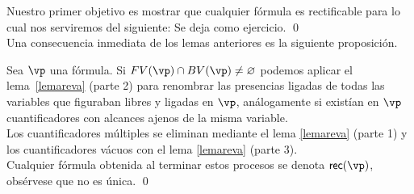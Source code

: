 \documentclass[11pt,letterpaper]{article}
\begin{document}
\noindent Nuestro primer objetivo es mostrar que cualquier fórmula es
rectificable para lo cual nos serviremos del siguiente:
\proof
Se deja como ejercicio.
\qed
\bigskip\\

Una consecuencia inmediata de los lemas anteriores es la siguiente proposición.

\proof
Sea $\vp$ una f\'ormula. Si $FV(\vp)\cap BV(\vp)\neq\varnothing$
podemos aplicar el lema~\ref{lemareva} (parte 2) para renombrar las
presencias ligadas de todas las variables que figuraban libres y
ligadas en $\vp$, an\'alogamente si existían en $\vp$ cuantificadores
con alcances ajenos de la misma variable. \\
Los cuantificadores m\'ultiples se eliminan mediante el lema 
\ref{lemareva} (parte 1) y los cuantificadores v\'acuos con el lema 
\ref{lemareva} (parte 3). \\
Cualquier f\'ormula obtenida al terminar estos procesos se denota 
$\mathsf{rec}(\vp)$,
obs\'ervese que no es \'unica.
\qed

\vspace{.5cm}
\end{document}
